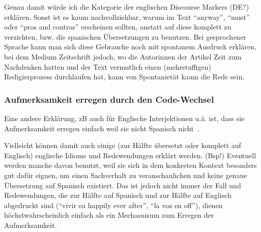 Genau damit würde ich die Kategorie der englischen Discourse Markers (DE?) erklären.
Sonst ist es kaum nachvollziehbar, warum im Text ``anyway'', ``must'' oder ``pros and contras'' erscheinen sollten, anstatt auf diese komplett zu verzichten, bzw. die spanischen Übersetzungen zu benutzen. %
Bei gesprochener Sprache kann man sich diese Gebrauche noch mit spontanem Ausdruck erklären, bei dem Medium Zeitschrift jedoch, wo die Autorinnen der Artikel Zeit zum Nachdenken hatten und der Text vermutlich einen (mehrstuffigen) Redigierprozess durchlaufen hat, kann von Spontanietät kaum die Rede sein.

\subsubsection{Aufmerksamkeit erregen durch den Code-Wechsel}
Eine andere Erklärung, zB auch für Englische Interjektionen u.ä. ist, dass sie Aufmerksamkeit erregen einfach weil sie nicht Spanisch nicht~\cite[]{Mahootian05}. %

Vielleicht können damit auch einige (zur Hälfte übersetzt oder komplett auf Englisch) englische Idiome und Redewendungen erklärt werden.
(Bsp!)
Eventuell werden manche davon benutzt, weil sie sich in dem konkreten Kontext besonders gut dafür eignen, um einen Sachverhalt zu veranschaulichen und keine genaue Übersetzung auf Spanisch existiert.
Das ist jedoch nicht immer der Fall und Redewendungen, die zur Hälfte auf Spanisch und zur Hälfte auf Englisch abgedruckt sind (``vivir su happily ever after'', ``la voz en off''), dienen höchstwahrscheinlich einfach als ein Mechasnisum zum Erregen der Aufmerksamkeit.

